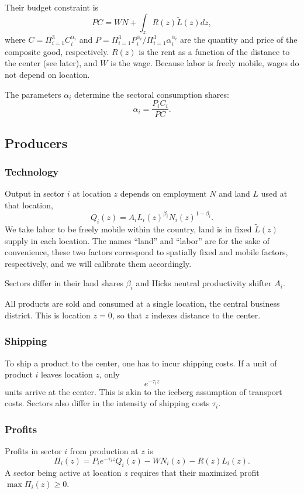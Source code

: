 \documentclass[12pt]{article}
\begin{document}
Their budget constraint is
\begin{equation}
\label{eq:BudCons}
PC=WN+\int_z R(z)\tilde{L}(z)dz,
\end{equation}
where $C=\Pi_{i=1}^3C_i^{\alpha_i}$ and $P=\Pi_{i=1}^3P_i^{\alpha_i}/\Pi_{i=1}^3\alpha_i^{\alpha_i}$ are the quantity and price of the composite good, respectively. $R(z)$ is the rent as a function of the distance to the center (see later), and $W$ is the wage. Because labor is freely mobile, wages do not depend on location.

The parameters $\alpha_i$ determine the sectoral consumption shares:
\begin{equation*}
\alpha_i=\frac{P_iC_i}{PC}.
\end{equation*}

\subsection{Producers}
\subsubsection{Technology}
Output in sector $i$ at location $z$ depends on employment $N$ and land $L$ used at that location,
\[
Q_i(z) = A_i L_i(z)^{\beta_i}N_i(z)^{1-\beta_i}.
\]
We take labor to be freely mobile within the country, land is in fixed $\tilde{L}(z)$ supply in each location. The names ``land'' and ``labor'' are for the sake of convenience, these two factors correspond to spatially fixed and mobile factors, respectively, and we will calibrate them accordingly.

Sectors differ in their land shares $\beta_i$ and Hicks neutral productivity shifter $A_i$.

All products are sold and consumed at a single location, the central business district. This is location $z=0$, so that $z$ indexes distance to the center.

\subsubsection{Shipping}
To ship a product to the center, one has to incur shipping costs. If a unit of product $i$ leaves location $z$, only
\[
e^{-\tau_i z}
\]
units arrive at the center. This is akin to the iceberg assumption of transport costs. Sectors also differ in the intensity of shipping costs $\tau_i$.

\subsubsection{Profits}
Profits in sector $i$ from production at $z$ is
\begin{equation}
\label{eq:profit}
\Pi_i(z)=P_ie^{-\tau_iz}Q_i(z)-WN_i(z)-R(z)L_i(z).
\end{equation}
A sector being active at location $z$ requires that their maximized profit $\max\Pi_i(z)\geq0.$
\end{document}
